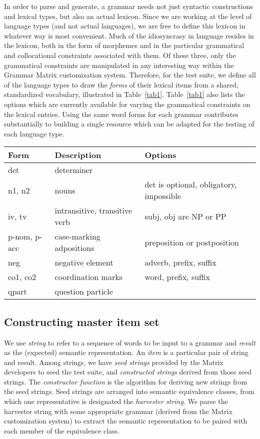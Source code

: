 \documentclass[11pt]{article}
\begin{document}
In order to parse and generate, a grammar needs not just syntactic
constructions and lexical types, but also an actual lexicon.  Since we
are working at the level of language types (and not actual languages),
we are free to define this lexicon in whatever way is most convenient.
Much of the idiosyncrasy in language resides in the lexicon, both in
the form of morphemes and in the particular grammatical and
collocational constraints associated with them.  Of these three, only
the grammatical constraints are manipulated in any interesting way
within the Grammar Matrix customization system.  Therefore, for the
test suite, we define all of the language types to draw the {\it
forms} of their lexical items from a shared, standardized vocabulary,
illustrated in Table~\ref{tab1}.  Table~\ref{tab1} also lists the
options which are currently available for varying the grammatical
constraints on the lexical entries.  Using the same word forms for
each grammar contributes substantially to building a single resource
which can be adapted for the testing of each language type.

\begin{table*}[ht]
\begin{center}
\begin{tabular}{|l|l|l|}
\hline
Form & Description & Options \\ \hline \hline
det & determiner & \\ 
n1, n2 & nouns & det is optional, obligatory, impossible\\
iv, tv & intransitive, transitive verb & subj, obj are NP or PP\\
p-nom, p-acc & case-marking adpositions & preposition or postposition\\
neg & negative element & adverb, prefix, suffix\\
co1, co2 & coordination marks & word, prefix, suffix\\
qpart & question particle & \\
\hline
\end{tabular}
\end{center}
\caption{Standardized lexicon}
\label{tab1}
\end{table*}


\subsection{Constructing master item set}

We use {\it string} to refer to a sequence of words to be input to a
grammar and {\it result} as the (expected) semantic representation.
An {\it item} is a particular pair of string and result.  Among
strings, we have {\it seed strings} provided by the Matrix developers
to seed the test suite, and {\it constructed strings} derived from
those seed strings.  The {\it constructor function} is the algorithm
for deriving new strings from the seed strings. Seed strings are
arranged into semantic equivalence classes, from which one
representative is designated the {\it harvester string}.  We parse the
harvester string with some appropriate grammar (derived from the
Matrix customization system) to extract the semantic representation to
be paired with each member of the equivalence class.
\end{document}
